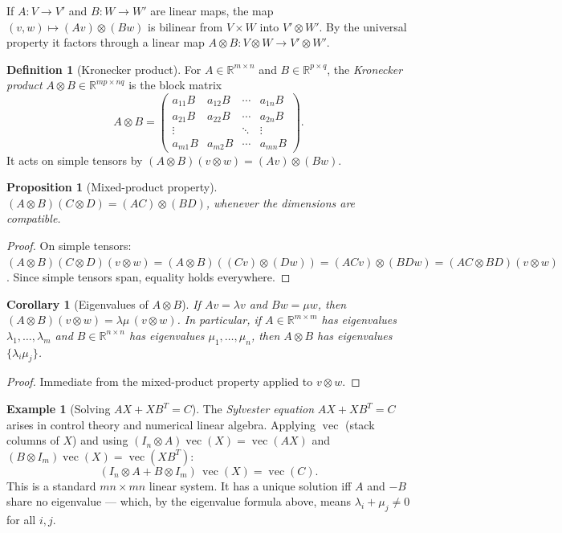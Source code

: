 \documentclass[11pt]{article}
\theoremstyle{definition}
\newtheorem{definition}{Definition}[section]
\newtheorem{example}{Example}[section]
\theoremstyle{plain}
\newtheorem{proposition}{Proposition}[section]
\newtheorem{corollary}{Corollary}[section]
\begin{document}
If $A: V\to V'$ and $B: W\to W'$ are linear maps, the map
$(v,w)\mapsto (Av)\otimes(Bw)$ is bilinear from $V\times W$ into
$V'\otimes W'$.  By the universal property it factors through a linear
map $A\otimes B: V\otimes W\to V'\otimes W'$.

\begin{definition}[Kronecker product]
  For $A\in\mathbb{R}^{m\times n}$ and $B\in\mathbb{R}^{p\times q}$, the
  \emph{Kronecker product} $A\otimes B\in\mathbb{R}^{mp\times nq}$ is the
  block matrix
  \[
    A\otimes B
    = \begin{pmatrix}
        a_{11}B & a_{12}B & \cdots & a_{1n}B \\
        a_{21}B & a_{22}B & \cdots & a_{2n}B \\
        \vdots  &         & \ddots & \vdots  \\
        a_{m1}B & a_{m2}B & \cdots & a_{mn}B
      \end{pmatrix}.
  \]
  It acts on simple tensors by $(A\otimes B)(v\otimes w) = (Av)\otimes(Bw)$.
\end{definition}

\begin{proposition}[Mixed-product property]
  $(A\otimes B)(C\otimes D) = (AC)\otimes(BD)$, whenever the dimensions
  are compatible.
\end{proposition}
\begin{proof}
  On simple tensors:
  $(A\otimes B)(C\otimes D)(v\otimes w)
  = (A\otimes B)((Cv)\otimes(Dw))
  = (ACv)\otimes(BDw)
  = (AC\otimes BD)(v\otimes w)$.
  Since simple tensors span, equality holds everywhere.
\end{proof}

\begin{corollary}[Eigenvalues of $A\otimes B$]
  If $Av = \lambda v$ and $Bw = \mu w$, then
  $(A\otimes B)(v\otimes w) = \lambda\mu\,(v\otimes w)$.
  In particular, if $A\in\mathbb{R}^{m\times m}$ has eigenvalues
  $\lambda_1,\ldots,\lambda_m$ and $B\in\mathbb{R}^{n\times n}$ has
  eigenvalues $\mu_1,\ldots,\mu_n$, then $A\otimes B$ has eigenvalues
  $\{\lambda_i\mu_j\}$.
\end{corollary}
\begin{proof}
  Immediate from the mixed-product property applied to $v\otimes w$.
\end{proof}

\begin{example}[Solving $AX + XB^T = C$]
  The \emph{Sylvester equation} $AX + XB^T = C$ arises in control theory
  and numerical linear algebra.  Applying $\operatorname{vec}$ (stack
  columns of $X$) and using
  $(I_n\otimes A)\operatorname{vec}(X) = \operatorname{vec}(AX)$ and
  $(B\otimes I_m)\operatorname{vec}(X) = \operatorname{vec}(XB^T)$:
  \[
    (I_n\otimes A + B\otimes I_m)\,\operatorname{vec}(X)
    = \operatorname{vec}(C).
  \]
  This is a standard $mn\times mn$ linear system.  It has a unique solution
  iff $A$ and $-B$ share no eigenvalue --- which, by the eigenvalue formula
  above, means $\lambda_i + \mu_j \ne 0$ for all $i,j$.
\end{example}
\end{document}
